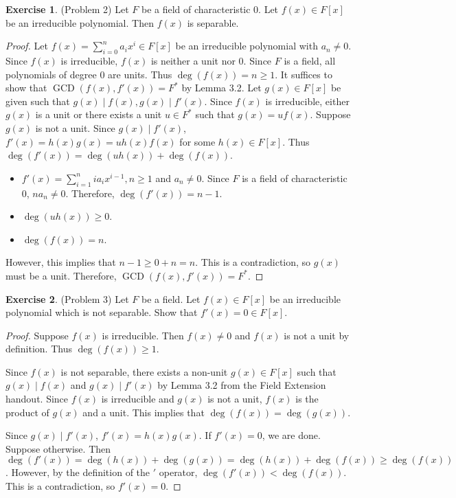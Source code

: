 \documentclass[12pt, psamsfonts]{amsart}
\theoremstyle{definition}
\newtheorem*{exer}{Exercise}
\theoremstyle{remark}
\DeclareMathOperator{\GCD}{GCD}
\numberwithin{equation}{section}
\begin{document}
\begin{exer}{(Problem 2)}
  Let $F$ be a field of characteristic 0.
  Let $f(x) \in F[x]$ be an irreducible polynomial.
  Then $f(x)$ is separable.
\end{exer}

\begin{proof}
  Let $f(x) = \sum_{i=0}^{n} a_ix^i \in F[x]$ be an irreducible polynomial with $a_n \ne 0$.
  Since $f(x)$ is irreducible, $f(x)$ is neither a unit nor 0.
  Since $F$ is a field, all polynomials of degree 0 are units.
  Thus $\deg(f(x)) = n \geq 1$.
  It suffices to show that $\GCD(f(x), f'(x)) = F^*$ by Lemma 3.2.
  Let $g(x) \in F[x]$ be given such that $g(x) \mid f(x), g(x) \mid f'(x)$.
  Since $f(x)$ is irreducible, either $g(x)$ is a unit or there exists a unit $u \in F^*$ such that $g(x) = uf(x)$.
  Suppose $g(x)$ is not a unit.
  Since $g(x) \mid f'(x)$, $f'(x) = h(x)g(x) = uh(x)f(x)$ for some $h(x) \in F[x]$.
  Thus $\deg(f'(x)) = \deg(uh(x)) + \deg(f(x))$.
  \begin{itemize}
    \item
      $f'(x) = \sum_{i = 1}^{n} ia_ix^{i - 1}, n \geq 1$ and $a_n \ne 0$.
      Since $F$ is a field of characteristic 0, $na_n \ne 0$.
      Therefore, $\deg(f'(x)) = n - 1$.
    \item
      $\deg(uh(x)) \geq 0$.
    \item
      $\deg(f(x)) = n$.
  \end{itemize}
  However, this implies that $n - 1 \geq 0 + n = n$.
  This is a contradiction, so $g(x)$ must be a unit.
  Therefore, $\GCD(f(x), f'(x)) = F^*$.
\end{proof}

\begin{exer}{(Problem 3)}
  Let $F$ be a field.
  Let $f(x) \in F[x]$ be an irreducible polynomial which is not separable.
  Show that $f'(x) = 0 \in F[x]$.
\end{exer}

\begin{proof}
  Suppose $f(x)$ is irreducible.
  Then $f(x) \ne 0$ and $f(x)$ is not a unit by definition.
  Thus $\deg(f(x)) \geq 1$.

  Since $f(x)$ is not separable, there exists a non-unit $g(x) \in F[x]$ such that $g(x) \mid f(x)$ and $g(x) \mid f'(x)$ by Lemma 3.2 from the Field Extension handout.
  Since $f(x)$ is irreducible and $g(x)$ is not a unit, $f(x)$ is the product of $g(x)$ and a unit.
  This implies that $\deg(f(x)) = \deg(g(x))$.

  Since $g(x) \mid f'(x)$, $f'(x) = h(x)g(x)$.
  If $f'(x) = 0$, we are done.
  Suppose otherwise.
  Then $\deg(f'(x)) = \deg(h(x)) + \deg(g(x)) = \deg(h(x)) + \deg(f(x)) \geq \deg(f(x))$.
  However, by the definition of the $'$ operator, $\deg(f'(x)) < \deg(f(x))$.
  This is a contradiction, so $f'(x) = 0$.
\end{proof}
\end{document}
